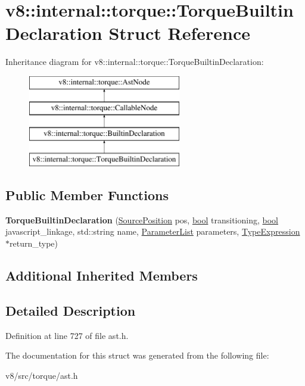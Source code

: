 \hypertarget{structv8_1_1internal_1_1torque_1_1TorqueBuiltinDeclaration}{}\section{v8\+:\+:internal\+:\+:torque\+:\+:Torque\+Builtin\+Declaration Struct Reference}
\label{structv8_1_1internal_1_1torque_1_1TorqueBuiltinDeclaration}
Inheritance diagram for v8\+:\+:internal\+:\+:torque\+:\+:Torque\+Builtin\+Declaration\+:\begin{figure}[H]
\begin{center}
\leavevmode
\includegraphics[height=4.000000cm]{structv8_1_1internal_1_1torque_1_1TorqueBuiltinDeclaration}
\end{center}
\end{figure}
\subsection*{Public Member Functions}
\begin{DoxyCompactItemize}
\item 
\mbox{\label{structv8_1_1internal_1_1torque_1_1TorqueBuiltinDeclaration_a9382bf0e1954d6ddb6b1e602bb0fc752}} 
{\bfseries Torque\+Builtin\+Declaration} (\mbox{\hyperlink{structv8_1_1internal_1_1torque_1_1SourcePosition}{Source\+Position}} pos, \mbox{\hyperlink{classbool}{bool}} transitioning, \mbox{\hyperlink{classbool}{bool}} javascript\+\_\+linkage, std\+::string name, \mbox{\hyperlink{structv8_1_1internal_1_1torque_1_1ParameterList}{Parameter\+List}} parameters, \mbox{\hyperlink{structv8_1_1internal_1_1torque_1_1TypeExpression}{Type\+Expression}} $\ast$return\+\_\+type)
\end{DoxyCompactItemize}
\subsection*{Additional Inherited Members}


\subsection{Detailed Description}


Definition at line 727 of file ast.\+h.



The documentation for this struct was generated from the following file\+:\begin{DoxyCompactItemize}
\item 
v8/src/torque/ast.\+h\end{DoxyCompactItemize}
